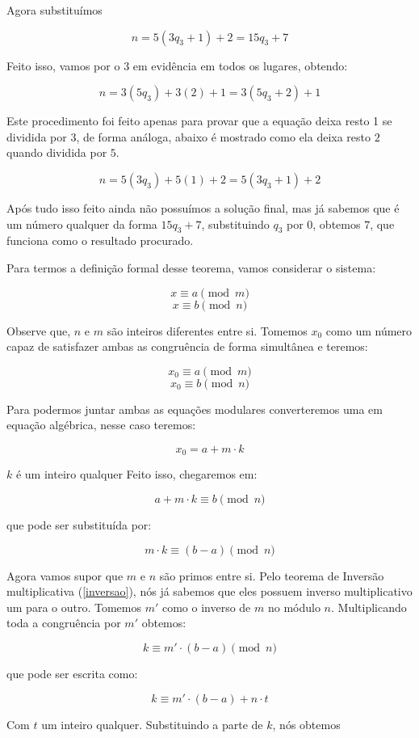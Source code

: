 Agora substitu\'imos

$$n = 5(3q_3 + 1) + 2 = 15q_3 +7$$

Feito isso, vamos por o $3$ em evid\^encia em todos os lugares, obtendo:

$$n = 3(5q_3) +3(2) +1 = 3(5q_3 +2)+1$$

Este procedimento foi feito apenas para provar que a equa\c{c}\~ao deixa resto 1 se dividida por 3, de forma an\'aloga, abaixo \'e mostrado como ela deixa resto $2$ quando dividida por $5$.

$$n = 5(3q_3) +5(1) +2 = 5(3q_3 +1)+2$$

Ap\'os tudo isso feito ainda n\~ao possu\'imos a solu\c{c}\~ao final, mas j\'a sabemos que \'e um n\'umero qualquer da forma $15q_3 + 7$, substituindo $q_3$ por $0$, obtemos $7$, que funciona como o resultado procurado.


Para termos a defini\c{c}\~ao formal desse teorema, vamos considerar o sistema:

$$x \equiv a \pmod{m}$$
$$x \equiv b \pmod{n}$$

Observe que, $n$ e $m$ s\~ao inteiros diferentes entre si. Tomemos $x_0$ como um n\'umero capaz de satisfazer ambas as congru\^encia de forma simult\^anea e teremos:

$$x_0 \equiv a \pmod{m}$$
$$x_0 \equiv b \pmod{n}$$

Para podermos juntar ambas as equa\c{c}\~oes modulares converteremos uma em equa\c{c}\~ao alg\'ebrica, nesse caso teremos: 

$$x_0 = a + m\cdot k$$

$k$ \'e um inteiro qualquer Feito isso, chegaremos em:

$$a + m\cdot k \equiv b \pmod{n}$$

que pode ser substitu\'ida por:

$$ m\cdot k \equiv (b-a) \pmod{n}$$

Agora vamos supor que $m$ e $n$ s\~ao primos entre si. Pelo teorema de Invers\~ao multiplicativa (\ref{inversao}), n\'os j\'a sabemos que eles possuem inverso multiplicativo um para o outro. Tomemos $m'$ como o inverso de $m$ no m\'odulo $n$. Multiplicando toda a congru\^encia por $m'$ obtemos:

$$ k \equiv m'\cdot(b-a) \pmod{n}$$

que pode ser escrita como:

$$ k \equiv m'\cdot(b-a)+n \cdot t$$


Com $t$ um inteiro qualquer. Substituindo a parte de $k$, n\'os obtemos

